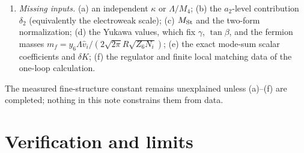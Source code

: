 \documentclass[11pt,letterpaper]{article}
\newcommand{\Lam}{\Lambda}
\begin{document}
\begin{enumerate}
\item \emph{Missing inputs.} (a) an independent $\kappa$ or $\Lam/M_4$; (b) the $a_2$-level contribution $\delta_2$ (equivalently the electroweak scale); (c) $M_{\rm St}$ and the two-form normalization; (d) the Yukawa values, which fix $\gamma$, $\tan\beta$, and the fermion masses $m_f=y_6\Lam\hat v_i/(2\sqrt{2\pi}R\sqrt{Z_6N_i})$; (e) the exact mode-sum scalar coefficients and $\delta K$; (f) the regulator and finite local matching data of the one-loop calculation.
\end{enumerate}
The measured fine-structure constant remains unexplained unless (a)--(f) are completed; nothing in this note constrains them from data.

\section{Verification and limits}
\end{document}
